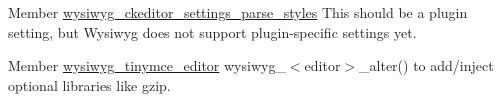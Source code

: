 \label{todo__todo000061}
\hypertarget{todo__todo000061}{}
 
\begin{DoxyDescription}
\item[Member \hyperlink{ckeditor_8inc_a333ec4086966407d90ad5ab846f44f94}{wysiwyg\_\-ckeditor\_\-settings\_\-parse\_\-styles} ]This should be a plugin setting, but Wysiwyg does not support plugin-\/specific settings yet. 
\end{DoxyDescription}

\label{todo__todo000062}
\hypertarget{todo__todo000062}{}
 
\begin{DoxyDescription}
\item[Member \hyperlink{tinymce_8inc_a20ecffb8ac4c4df58bf2bcbada9dac13}{wysiwyg\_\-tinymce\_\-editor} ]wysiwyg\_\-$<$editor$>$\_\-alter() to add/inject optional libraries like gzip. 
\end{DoxyDescription}